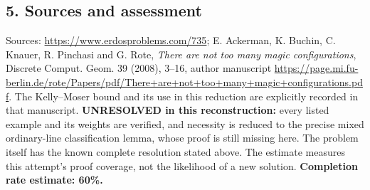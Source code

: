 \subsection*{5. Sources and assessment}
Sources: \url{https://www.erdosproblems.com/735}; E. Ackerman, K. Buchin, C. Knauer, R. Pinchasi and G. Rote, \emph{There are not too many magic configurations}, Discrete Comput. Geom. 39 (2008), 3--16, author manuscript \url{https://page.mi.fu-berlin.de/rote/Papers/pdf/There+are+not+too+many+magic+configurations.pdf}. The Kelly--Moser bound and its use in this reduction are explicitly recorded in that manuscript.
\textbf{UNRESOLVED in this reconstruction:} every listed example and its weights are verified, and necessity is reduced to the precise mixed ordinary-line classification lemma, whose proof is still missing here. The problem itself has the known complete resolution stated above. The estimate measures this attempt's proof coverage, not the likelihood of a new solution.
\textbf{Completion rate estimate: 60\%.}
